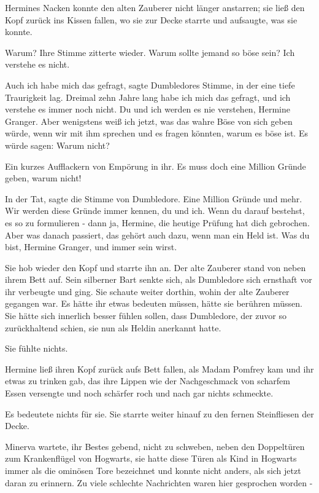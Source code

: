 Hermines Nacken konnte den alten Zauberer nicht länger anstarren; sie ließ den
Kopf zurück ins Kissen fallen, wo sie zur Decke starrte und aufsaugte, was sie
konnte.

\glqq Warum?\grqq{} Ihre Stimme zitterte wieder. \glqq Warum sollte jemand so
böse sein? Ich verstehe es nicht.\grqq{}

\glqq Auch ich habe mich das gefragt\grqq{}, sagte Dumbledores Stimme, in der
eine tiefe Traurigkeit lag. \glqq Dreimal zehn Jahre lang habe ich mich das
gefragt, und ich verstehe es immer noch nicht. Du und ich werden es nie
verstehen, Hermine Granger. Aber wenigstens weiß ich jetzt, was das wahre Böse
von sich geben würde, wenn wir mit ihm sprechen und es fragen könnten, warum es
böse ist. Es würde sagen: \glqq Warum nicht?\grqq{}

Ein kurzes Aufflackern von Empörung in ihr. \glqq Es muss doch eine Million
Gründe geben, warum nicht!\grqq{}

\glqq In der Tat\grqq{}, sagte die Stimme von Dumbledore. \glqq Eine Million
Gründe und mehr. Wir werden diese Gründe immer kennen, du und ich. Wenn du
darauf bestehst, es so zu formulieren - dann ja, Hermine, die heutige Prüfung
hat dich gebrochen. Aber was danach passiert, das gehört auch dazu, wenn man ein
Held ist. Was du bist, Hermine Granger, und immer sein wirst.\grqq{}

Sie hob wieder den Kopf und starrte ihn an. Der alte Zauberer stand von neben
ihrem Bett auf. Sein silberner Bart senkte sich, als Dumbledore sich ernsthaft
vor ihr verbeugte und ging. Sie schaute weiter dorthin, wohin der alte Zauberer
gegangen war. Es hätte ihr etwas bedeuten müssen, hätte sie berühren müssen. Sie
hätte sich innerlich besser fühlen sollen, dass Dumbledore, der zuvor so
zurückhaltend schien, sie nun als Heldin anerkannt hatte.

Sie fühlte nichts.

Hermine ließ ihren Kopf zurück aufs Bett fallen, als Madam Pomfrey kam und ihr
etwas zu trinken gab, das ihre Lippen wie der Nachgeschmack von scharfem Essen
versengte und noch schärfer roch und nach gar nichts schmeckte.

Es bedeutete nichts für sie. Sie starrte weiter hinauf zu den fernen
Steinfliesen der Decke.

Minerva wartete, ihr Bestes gebend, nicht zu schweben, neben den Doppeltüren zum
Krankenflügel von Hogwarts, sie hatte diese Türen als Kind in Hogwarts immer als
\glqq die ominösen Tore\grqq{} bezeichnet und konnte nicht anders, als sich
jetzt daran zu erinnern. Zu viele schlechte Nachrichten waren hier gesprochen
worden -


